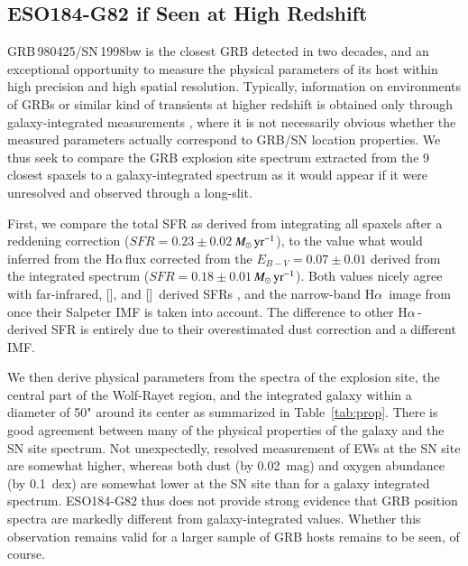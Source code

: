 \documentclass[traditabstract]{aa}
\newcommand{\ha}{H$\alpha$}
\newcommand{\oi}{[\ion{O}{i}]}
\newcommand{\cii}{[\ion{C}{ii}]}
\newcommand{\Msunyr}{$M_\odot\,\rm{yr}^{-1}$}
\begin{document}
\subsection{ESO184-G82 if Seen at High Redshift}


GRB\,980425/SN\,1998bw is the closest GRB detected in two decades, and an exceptional opportunity to measure the physical parameters of its host within high precision and high spatial resolution. Typically, information on environments of GRBs or similar kind of transients  at higher redshift is obtained only through galaxy-integrated measurements \citep{2015A&A...581A.125K, 2016A&A...590A.129J}, where it is not necessarily obvious whether the measured parameters actually correspond to GRB/SN location properties. We thus seek to compare the GRB explosion site spectrum extracted from the 9 closest spaxels to a galaxy-integrated spectrum as it would appear if it were unresolved and observed through a long-slit. 

First, we compare the total SFR as derived from integrating all spaxels after a reddening correction ($SFR=0.23\pm0.02$\,\Msunyr), to the value what would inferred from the \ha\,flux corrected from the $E_{B-V}=0.07\pm0.01$ derived from the integrated spectrum ($SFR=0.18\pm0.01$\,\Msunyr). Both values nicely agree with far-infrared, \oi, and \cii\, derived SFRs \citep{2014A&A...562A..70M, 2016arXiv160901742M}, and the narrow-band \ha\, image from \citet{2005NewA...11..103S} once their Salpeter IMF is taken into account. The difference to other \ha\,-derived SFR \citep{2006A&A...454..103H, 2008A&A...490...45C} is entirely due to their overestimated dust correction and a different IMF.

We then derive physical parameters from the spectra of the explosion site, the central part of the Wolf-Rayet region, and the integrated galaxy within a diameter of 50" around its center as summarized in Table~\ref{tab:prop}. There is good agreement between many of the physical properties of the galaxy and the SN site spectrum. Not unexpectedly, resolved measurement of EWs at the SN site are somewhat higher, whereas both dust (by 0.02~mag) and oxygen abundance (by 0.1~dex) are somewhat lower at the SN site than for a galaxy integrated spectrum. ESO184-G82 thus does not provide strong evidence that GRB position spectra are markedly different from galaxy-integrated values. Whether this observation remains valid for a larger sample of GRB hosts remains to be seen, of course.
\end{document}
